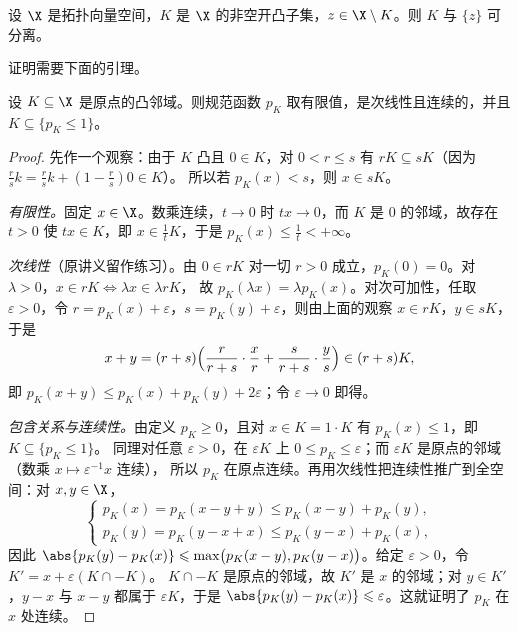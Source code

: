 \begin{corollary}
\label{res:3}
设 $\X$ 是拓扑向量空间，$K$ 是 $\X$ 的非空开凸子集，$z\in\X\setminus K$。则 $K$ 与 $\{z\}$ 可分离。
\end{corollary}

证明需要下面的引理。

\begin{lemma}
\label{res:4}
设 $K\subseteq\X$ 是原点的凸邻域。则规范函数 $p_K$ 取有限值，是次线性且连续的，并且 $K\subseteq\{p_K\leqslant1\}$。
\end{lemma}

\begin{proof}
先作一个观察：由于 $K$ 凸且 $0\in K$，对 $0<r\leqslant s$ 有 $rK\subseteq sK$（因为 $\tfrac rs k=\tfrac rs k+(1-\tfrac rs)0\in K$）。
所以若 $p_K(x)<s$，则 $x\in sK$。

\emph{有限性。}固定 $x\in\X$。数乘连续，$t\to0$ 时 $tx\to0$，而 $K$ 是 $0$ 的邻域，故存在 $t>0$ 使 $tx\in K$，即 $x\in\frac1tK$，于是 $p_K(x)\leqslant\frac1t<+\infty$。

\emph{次线性}（原讲义留作练习）。由 $0\in rK$ 对一切 $r>0$ 成立，$p_K(0)=0$。对 $\lambda>0$，$x\in rK\iff\lambda x\in\lambda rK$，
故 $p_K(\lambda x)=\lambda p_K(x)$。对次可加性，任取 $\varepsilon>0$，令 $r=p_K(x)+\varepsilon$，$s=p_K(y)+\varepsilon$，则由上面的观察 $x\in rK$，$y\in sK$，于是
\[
  x+y=(r+s)\Bigl(\frac{r}{r+s}\cdot\frac xr+\frac{s}{r+s}\cdot\frac ys\Bigr)\in(r+s)K,
\]
即 $p_K(x+y)\leqslant p_K(x)+p_K(y)+2\varepsilon$；令 $\varepsilon\to0$ 即得。

\emph{包含关系与连续性。}由定义 $p_K\geqslant0$，且对 $x\in K=1\cdot K$ 有 $p_K(x)\leqslant1$，即 $K\subseteq\{p_K\leqslant1\}$。
同理对任意 $\varepsilon>0$，在 $\varepsilon K$ 上 $0\leqslant p_K\leqslant\varepsilon$；而 $\varepsilon K$ 是原点的邻域（数乘 $x\mapsto\varepsilon^{-1}x$ 连续），
所以 $p_K$ 在原点连续。再用次线性把连续性推广到全空间：对 $x,y\in\X$，
\[
  \begin{cases}
    p_K(x)=p_K(x-y+y)\leqslant p_K(x-y)+p_K(y),\\
    p_K(y)=p_K(y-x+x)\leqslant p_K(y-x)+p_K(x),
  \end{cases}
\]
因此 $\abs{p_K(y)-p_K(x)}\leqslant\max\bigl(p_K(x-y),p_K(y-x)\bigr)$。给定 $\varepsilon>0$，令 $K'=x+\varepsilon(K\cap-K)$。
$K\cap-K$ 是原点的邻域，故 $K'$ 是 $x$ 的邻域；对 $y\in K'$，$y-x$ 与 $x-y$ 都属于 $\varepsilon K$，于是 $\abs{p_K(y)-p_K(x)}\leqslant\varepsilon$。这就证明了 $p_K$ 在 $x$ 处连续。
\end{proof}

